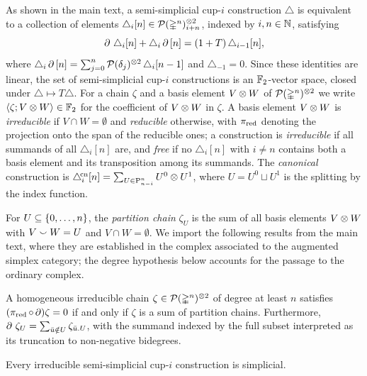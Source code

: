 \documentclass{amsart}
\begin{document}
As shown in the main text, a semi-simplicial \mbox{cup-$i$} construction $\triangle$ is equivalent to a collection of elements $\triangle_i[n] \in \mathcal{P}(\mathbb{\Delta}^n)^{\otimes 2}_{i+n}$, indexed by $i, n \in \mathbb{N}$, satisfying
\begin{equation}\label{eq:defining}
	\operatorname{\partial}\, \triangle_i[n] + \triangle_i \operatorname{\partial}\,[n] = (1+T)\, \triangle_{i-1}[n],
\end{equation}
where $\triangle_i\operatorname{\partial}\,[n] = \sum_{j=0}^{n} \mathcal{P}(\delta_j)^{\otimes 2}\, \triangle_i[n-1]$ and $\triangle_{-1} = 0$.
Since these identities are linear, the set of semi-simplicial \mbox{cup-$i$} constructions is an ${\mathbb{F}_2}$-vector space, closed under $\triangle \mapsto T\triangle$.
For a chain $\zeta$ and a basis element $V \otimes W$ of $\mathcal{P}(\mathbb{\Delta}^n)^{\otimes 2}$ we write $\langle \zeta ; V \otimes W \rangle \in {\mathbb{F}_2}$ for the coefficient of $V \otimes W$ in $\zeta$.
A basis element $V \otimes W$ is \emph{irreducible} if $V \cap W = \emptyset$ and \emph{reducible} otherwise, with $\operatorname{\pi_{\text{red}}}$ denoting the projection onto the span of the reducible ones; a construction is \emph{irreducible} if all summands of all $\triangle_i[n]$ are, and \emph{free} if no $\triangle_i[n]$ with $i \neq n$ contains both a basis element and its transposition among its summands.
The \emph{canonical} construction is $\triangle^{\!\mathrm{cn}}_i[n] = \sum_{U \in \mathrm{P}^n_{n-i}} U^0 \otimes U^1$, where $U = U^0 \sqcup U^1$ is the splitting by the index function.

For $U \subseteq \{0, \dots, n\}$, the \emph{partition chain} $\zeta_U$ is the sum of all basis elements $V \otimes W$ with $V \union W = U$ and $V \cap W = \emptyset$.
We import the following results from the main text, where they are established in the complex associated to the augmented simplex category; the degree hypothesis below accounts for the passage to the ordinary complex.

\begin{lemma}\label{l:partition_chains}
	A homogeneous irreducible chain $\zeta \in \mathcal{P}(\mathbb{\Delta}^n)^{\otimes 2}$ of degree at least $n$ satisfies $(\operatorname{\pi_{\text{red}}} \circ \operatorname{\partial})\zeta = 0$ if and only if $\zeta$ is a sum of partition chains.
	Furthermore, $\operatorname{\partial}\, \zeta_U = \sum_{\bar u \notin U} \zeta_{\bar u . U}$, with the summand indexed by the full subset interpreted as its truncation to non-negative bidegrees.
\end{lemma}

\begin{theorem}[Simpliciality]\label{t:irreducible_implies_simplicial}
	Every irreducible semi-simplicial \mbox{cup-$i$} construction is simplicial.
\end{theorem}
\end{document}
